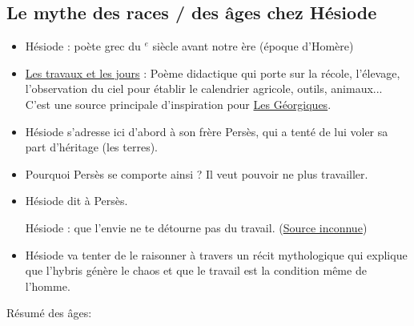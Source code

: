 \documentclass[a4paper, 11pt, hidelinks]{article}
\newcommand{\bs}{\bigskip}
\newcommand{\rb}[1]{\Romanbar{#1}}
\newcommand{\citer}[3]{\bs \begin{center} \textcolor{authorGray}{#1 :} \textcolor{citationRed}{\og #2 \fg} \textcolor{authorGray}{(\underline{#3})} \end{center} \bs}
\begin{document}
\subsection{Le mythe des \og races \fg / des âges chez Hésiode}


\begin{itemize}
    \item Hésiode : poète grec du \rb{18}$^e$ siècle avant notre ère (époque d'Homère)
    \item \underline{Les travaux et les jours} : Poème didactique qui porte sur la récole, l'élevage, l'observation du ciel pour établir le
    calendrier agricole, outils, animaux... C'est une source principale d'inspiration pour \underline{Les Géorgiques}.
    \item Hésiode s'adresse ici d'abord à son frère Persès, qui a tenté de lui voler sa part d'héritage (les terres).
    \item Pourquoi Persès se comporte ainsi ? Il veut pouvoir ne plus travailler.
    \item Hésiode dit à Persès. \citer{Hésiode}{que l'envie ne te détourne pas du travail.}{Source inconnue}
    \item Hésiode va tenter de le raisonner à travers un récit mythologique qui explique que l'hybris génère le chaos et 
    que le travail est la condition même de l'homme.
\end{itemize}

\bs

\bs

Résumé des âges:
\bs
\end{document}
